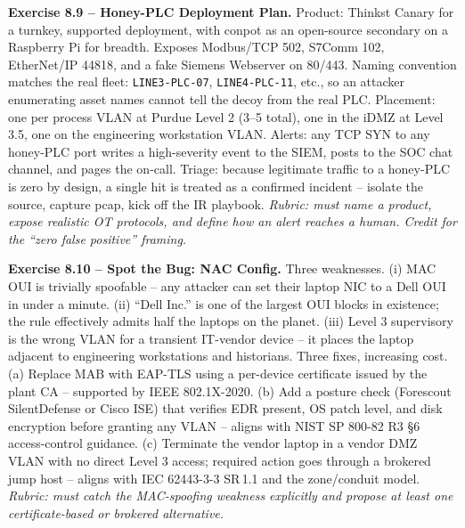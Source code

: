 \documentclass[11pt,a4paper]{article}
\begin{document}
\begin{solutionbox}
\textbf{Exercise 8.9 -- Honey-PLC Deployment Plan.}
Product: Thinkst Canary for a turnkey, supported deployment, with conpot as an open-source secondary on a Raspberry Pi for breadth. Exposes Modbus/TCP 502, S7Comm 102, EtherNet/IP 44818, and a fake Siemens Webserver on 80/443. Naming convention matches the real fleet: \texttt{LINE3-PLC-07}, \texttt{LINE4-PLC-11}, etc., so an attacker enumerating asset names cannot tell the decoy from the real PLC. Placement: one per process VLAN at Purdue Level 2 (3--5 total), one in the iDMZ at Level 3.5, one on the engineering workstation VLAN. Alerts: any TCP SYN to any honey-PLC port writes a high-severity event to the SIEM, posts to the SOC chat channel, and pages the on-call. Triage: because legitimate traffic to a honey-PLC is zero by design, a single hit is treated as a confirmed incident -- isolate the source, capture pcap, kick off the IR playbook.
\textit{Rubric: must name a product, expose realistic OT protocols, and define how an alert reaches a human. Credit for the ``zero false positive'' framing.}
\end{solutionbox}

\begin{solutionbox}
\textbf{Exercise 8.10 -- Spot the Bug: NAC Config.}
Three weaknesses. (i) MAC OUI is trivially spoofable -- any attacker can set their laptop NIC to a Dell OUI in under a minute. (ii) ``Dell Inc.'' is one of the largest OUI blocks in existence; the rule effectively admits half the laptops on the planet. (iii) Level 3 supervisory is the wrong VLAN for a transient IT-vendor device -- it places the laptop adjacent to engineering workstations and historians. Three fixes, increasing cost. (a) Replace MAB with EAP-TLS using a per-device certificate issued by the plant CA -- supported by IEEE 802.1X-2020. (b) Add a posture check (Forescout SilentDefense or Cisco ISE) that verifies EDR present, OS patch level, and disk encryption before granting any VLAN -- aligns with NIST SP 800-82 R3 \S 6 access-control guidance. (c) Terminate the vendor laptop in a vendor DMZ VLAN with no direct Level 3 access; required action goes through a brokered jump host -- aligns with IEC 62443-3-3 SR\,1.1 and the zone/conduit model.
\textit{Rubric: must catch the MAC-spoofing weakness explicitly and propose at least one certificate-based or brokered alternative.}
\end{solutionbox}
\end{document}
